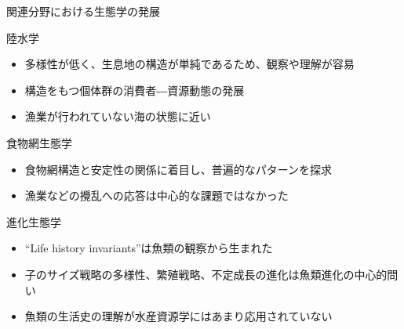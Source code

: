 \documentclass[
  ignorenonframetext,
]{beamer}
\providecommand{\tightlist}{%
  \setlength{\itemsep}{0pt}\setlength{\parskip}{0pt}}
\begin{document}
\begin{frame}{関連分野における生態学の発展}
\protect\hypertarget{ux95a2ux9023ux5206ux91ceux306bux304aux3051ux308bux751fux614bux5b66ux306eux767aux5c55}{}

\begin{block}{陸水学}

\begin{itemize}
\tightlist
\item
  多様性が低く、生息地の構造が単純であるため、観察や理解が容易
\item
  構造をもつ個体群の消費者―資源動態の発展
\item
  漁業が行われていない海の状態に近い
\end{itemize}

\end{block}

\begin{block}{食物網生態学}

\begin{itemize}
\tightlist
\item
  食物網構造と安定性の関係に着目し、普遍的なパターンを探求
\item
  漁業などの攪乱への応答は中心的な課題ではなかった
\end{itemize}

\end{block}

\begin{block}{進化生態学}

\begin{itemize}
\tightlist
\item
  ``Life history invariants''は魚類の観察から生まれた
\item
  子のサイズ戦略の多様性、繁殖戦略、不定成長の進化は魚類進化の中心的問い
\item
  魚類の生活史の理解が水産資源学にはあまり応用されていない
\end{itemize}

\end{block}

\end{frame}
\end{document}
